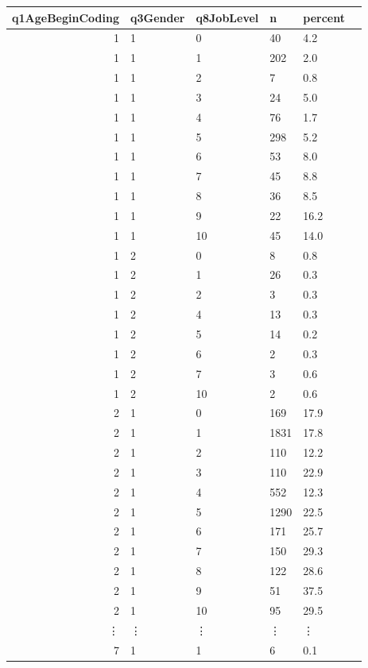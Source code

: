 \documentclass[11pt]{article}
\begin{document}
    \begin{tabular}{r|lllll}
 q1AgeBeginCoding & q3Gender & q8JobLevel & n & percent\\
\hline
	 1    & 1    &  0   &   40 &  4.2\\
	 1    & 1    &  1   &  202 &  2.0\\
	 1    & 1    &  2   &    7 &  0.8\\
	 1    & 1    &  3   &   24 &  5.0\\
	 1    & 1    &  4   &   76 &  1.7\\
	 1    & 1    &  5   &  298 &  5.2\\
	 1    & 1    &  6   &   53 &  8.0\\
	 1    & 1    &  7   &   45 &  8.8\\
	 1    & 1    &  8   &   36 &  8.5\\
	 1    & 1    &  9   &   22 & 16.2\\
	 1    & 1    & 10   &   45 & 14.0\\
	 1    & 2    &  0   &    8 &  0.8\\
	 1    & 2    &  1   &   26 &  0.3\\
	 1    & 2    &  2   &    3 &  0.3\\
	 1    & 2    &  4   &   13 &  0.3\\
	 1    & 2    &  5   &   14 &  0.2\\
	 1    & 2    &  6   &    2 &  0.3\\
	 1    & 2    &  7   &    3 &  0.6\\
	 1    & 2    & 10   &    2 &  0.6\\
	 2    & 1    &  0   &  169 & 17.9\\
	 2    & 1    &  1   & 1831 & 17.8\\
	 2    & 1    &  2   &  110 & 12.2\\
	 2    & 1    &  3   &  110 & 22.9\\
	 2    & 1    &  4   &  552 & 12.3\\
	 2    & 1    &  5   & 1290 & 22.5\\
	 2    & 1    &  6   &  171 & 25.7\\
	 2    & 1    &  7   &  150 & 29.3\\
	 2    & 1    &  8   &  122 & 28.6\\
	 2    & 1    &  9   &   51 & 37.5\\
	 2    & 1    & 10   &   95 & 29.5\\
	 ⋮ & ⋮ & ⋮ & ⋮ & ⋮\\
	 7   & 1   &  1  &  6  & 0.1\\

\end{tabular}
\end{document}
